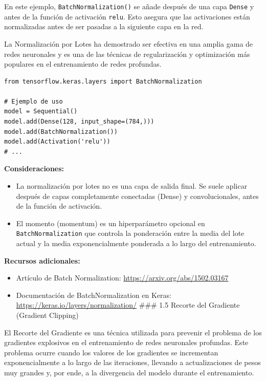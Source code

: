 \documentclass[11pt]{article}
\begin{document}
En este ejemplo, \texttt{BatchNormalization()} se añade después de una capa
\texttt{Dense} y antes de la función de activación \texttt{relu}. Esto asegura que las
activaciones están normalizadas antes de ser pasadas a la siguiente capa
en la red.

La Normalización por Lotes ha demostrado ser efectiva en una amplia gama
de redes neuronales y es una de las técnicas de regularización y
optimización más populares en el entrenamiento de redes profundas.

\begin{verbatim}
from tensorflow.keras.layers import BatchNormalization

# Ejemplo de uso
model = Sequential()
model.add(Dense(128, input_shape=(784,)))
model.add(BatchNormalization())
model.add(Activation('relu'))
# ...
\end{verbatim}

\textbf{Consideraciones:}

\begin{itemize}
\item La normalización por lotes no es una capa de salida final. Se suele
aplicar después de capas completamente conectadas (Dense) y
convolucionales, antes de la función de activación.
\item El momento (momentum) es un hiperparámetro opcional en
\texttt{BatchNormalization} que controla la ponderación entre la media del
lote actual y la media exponencialmente ponderada a lo largo del
entrenamiento.
\end{itemize}

\textbf{Recursos adicionales:}

\begin{itemize}
\item Artículo de Batch Normalization: \url{https://arxiv.org/abs/1502.03167}
\item Documentación de BatchNormalization en Keras:
\url{https://keras.io/layers/normalization/} \#\#\# 1.5 Recorte del
Gradiente (Gradient Clipping)
\end{itemize}

El Recorte del Gradiente es una técnica utilizada para prevenir el
problema de los gradientes explosivos en el entrenamiento de redes
neuronales profundas. Este problema ocurre cuando los valores de los
gradientes se incrementan exponencialmente a lo largo de las
iteraciones, llevando a actualizaciones de pesos muy grandes y, por
ende, a la divergencia del modelo durante el entrenamiento.
\end{document}
